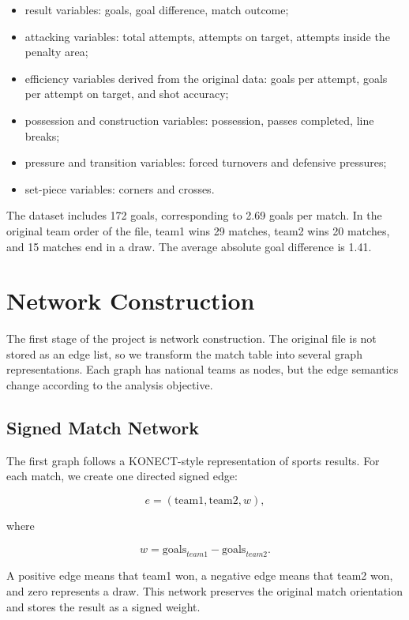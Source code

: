 \documentclass[10pt,twocolumn]{article}
\begin{document}
\begin{itemize}
    \item result variables: goals, goal difference, match outcome;
    \item attacking variables: total attempts, attempts on target, attempts inside the penalty area;
    \item efficiency variables derived from the original data: goals per attempt, goals per attempt on target, and shot accuracy;
    \item possession and construction variables: possession, passes completed, line breaks;
    \item pressure and transition variables: forced turnovers and defensive pressures;
    \item set-piece variables: corners and crosses.
\end{itemize}

The dataset includes 172 goals, corresponding to 2.69 goals per match. In the original team order of the file, team1 wins 29 matches, team2 wins 20 matches, and 15 matches end in a draw. The average absolute goal difference is 1.41.

\section{Network Construction}

The first stage of the project is network construction. The original file is not stored as an edge list, so we transform the match table into several graph representations. Each graph has national teams as nodes, but the edge semantics change according to the analysis objective.

\subsection{Signed Match Network}

The first graph follows a KONECT-style representation of sports results. For each match, we create one directed signed edge:

\[
    e = (\text{team1}, \text{team2}, w),
\]

where

\[
    w = \text{goals}_{team1} - \text{goals}_{team2}.
\]

A positive edge means that team1 won, a negative edge means that team2 won, and zero represents a draw. This network preserves the original match orientation and stores the result as a signed weight.
\end{document}
